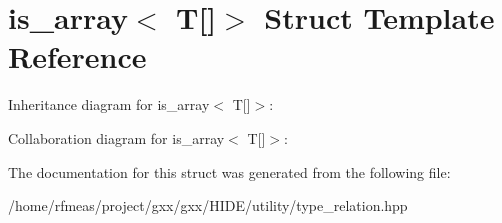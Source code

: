 \hypertarget{structis__array_3_01T[]_4}{}\section{is\+\_\+array$<$ T\mbox{[}\mbox{]}$>$ Struct Template Reference}
\label{structis__array_3_01T[]_4}


Inheritance diagram for is\+\_\+array$<$ T\mbox{[}\mbox{]}$>$\+:


Collaboration diagram for is\+\_\+array$<$ T\mbox{[}\mbox{]}$>$\+:


The documentation for this struct was generated from the following file\+:\begin{DoxyCompactItemize}
\item 
/home/rfmeas/project/gxx/gxx/\+H\+I\+D\+E/utility/type\+\_\+relation.\+hpp\end{DoxyCompactItemize}
